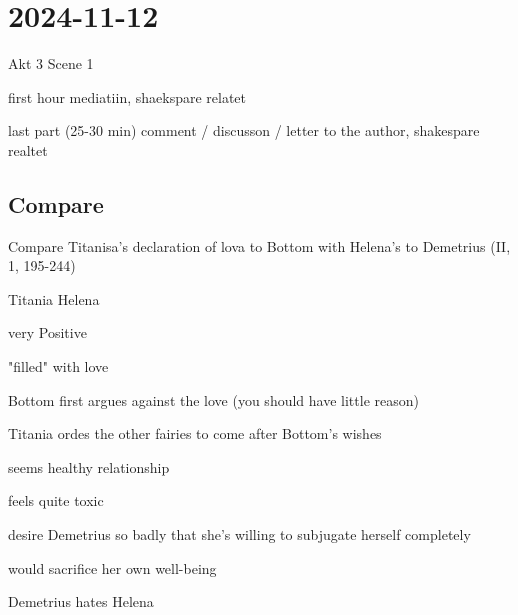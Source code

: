 \section{2024-11-12}

Akt 3 Scene 1

first hour mediatiin, shaekspare relatet

last part (25-30 min) comment / discusson / letter to the author, shakespare realtet 

\subsection{Compare}

\startframedtask
Compare Titanisa's declaration of lova to Bottom with Helena's to Demetrius (II, 1, 195-244)
\stopframedtask

\startplacetable[location={here},title={Titania vs Helene, waking up from the love potion}]
\setupTABLE[r][1][background=color,backgroundcolor=gray]
\setupTABLE[each][offset=1mm]
\bTABLE
\bTR
\bTD Titania \eTD \bTD Helena \eTD
\eTR
\bTR
\bTD
\startitemize[packed]
\item very Positive
\item "filled" with love
\item Bottom first argues against the love (you should have little reason)
\item Titania ordes the other fairies to come after Bottom's wishes
\item seems healthy relationship 
\stopitemize
\eTD 
\bTD
\startitemize[packed]
\item feels quite toxic
\startitemize[packed]
\item desire Demetrius so badly that she’s willing to subjugate herself completely
\item would sacrifice her own well-being
\stopitemize
\item Demetrius hates Helena
\stopitemize
\eTD
\eTR
\eTABLE
\stopplacetable


